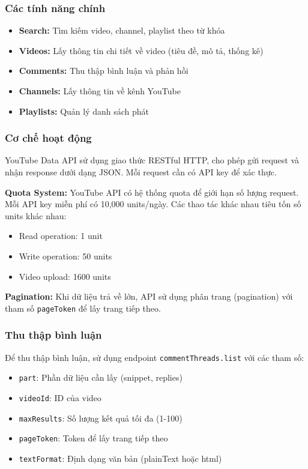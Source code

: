 \subsubsection{Các tính năng chính}
\begin{itemize}
    \item \textbf{Search:} Tìm kiếm video, channel, playlist theo từ khóa
    \item \textbf{Videos:} Lấy thông tin chi tiết về video (tiêu đề, mô tả, thống kê)
    \item \textbf{Comments:} Thu thập bình luận và phản hồi
    \item \textbf{Channels:} Lấy thông tin về kênh YouTube
    \item \textbf{Playlists:} Quản lý danh sách phát
\end{itemize}

\subsubsection{Cơ chế hoạt động}
YouTube Data API sử dụng giao thức RESTful HTTP, cho phép gửi request và nhận response dưới dạng JSON. Mỗi request cần có API key để xác thực.

\textbf{Quota System:}
YouTube API có hệ thống quota để giới hạn số lượng request. Mỗi API key miễn phí có 10,000 units/ngày. Các thao tác khác nhau tiêu tốn số units khác nhau:
\begin{itemize}
    \item Read operation: 1 unit
    \item Write operation: 50 units
    \item Video upload: 1600 units
\end{itemize}

\textbf{Pagination:}
Khi dữ liệu trả về lớn, API sử dụng phân trang (pagination) với tham số \texttt{pageToken} để lấy trang tiếp theo.

\subsubsection{Thu thập bình luận}
Để thu thập bình luận, sử dụng endpoint \texttt{commentThreads.list} với các tham số:
\begin{itemize}
    \item \texttt{part}: Phần dữ liệu cần lấy (snippet, replies)
    \item \texttt{videoId}: ID của video
    \item \texttt{maxResults}: Số lượng kết quả tối đa (1-100)
    \item \texttt{pageToken}: Token để lấy trang tiếp theo
    \item \texttt{textFormat}: Định dạng văn bản (plainText hoặc html)
\end{itemize}

